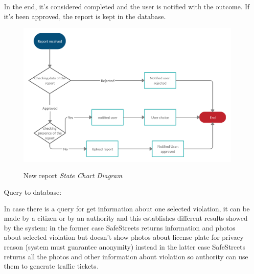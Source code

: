 \documentclass[../RASD.tex]{subfiles}
\begin{document}
    In the end, it’s considered completed and the user is notified with the outcome. If it’s been approved, the report is kept in the database.
    \begin{figure}[H]
        \centering
        \includegraphics[scale = 0.3]{assets/newReportV2.png}\\[1.6 cm]
        \caption[ New report \textit{State Chart Diagram}]{ New report \textit{State Chart Diagram}}
    \end{figure}

    Query to database:

    In case there is a query for get information about one selected violation, it can be made by a citizen or by an authority and this establishes different results showed by the system: in the former case SafeStreets returns information and photos about selected violation but doesn’t show photos about license plate for privacy reason (system must guarantee anonymity) instead in the latter case SafeStreets returns all the photos and other information about violation so authority can use them to generate traffic tickets.
\end{document}
